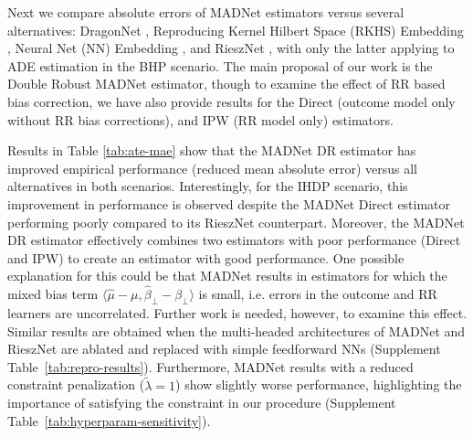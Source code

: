 Next we compare absolute errors of MADNet estimators versus several alternatives: DragonNet \citep{Shi2019}, Reproducing Kernel Hilbert Space (RKHS) Embedding \citep{Singh2023}, Neural Net (NN) Embedding \citep{Xu2022}, and RieszNet \citep{Chernozhukov2022}, with only the latter applying to ADE estimation in the BHP scenario. The main proposal of our work is the Double Robust MADNet estimator, though to examine the effect of RR based bias correction, we have also provide results for the Direct (outcome model only without RR bias corrections), and IPW (RR model only) estimators.

Results in Table \ref{tab:ate-mae} show that the MADNet DR estimator has improved empirical performance (reduced mean absolute error) versus all alternatives in both scenarios. Interestingly, for the IHDP scenario, this improvement in performance is observed despite the MADNet Direct estimator performing poorly compared to its RieszNet counterpart. Moreover, the MADNet DR estimator effectively combines two estimators with poor performance (Direct and IPW) to create an estimator with good performance. One possible explanation for this could be that MADNet results in estimators for which the mixed bias term $\langle \hat{\mu} - \mu, \hat{\beta}_\perp - \beta_\perp \rangle$ is small, i.e. errors in the outcome and RR learners are uncorrelated. Further work is needed, however, to examine this effect.
Similar results are obtained when the multi-headed architectures of MADNet and RieszNet are ablated and replaced with simple feedforward NNs (Supplement Table~\ref{tab:repro-results}). Furthermore, MADNet results with a reduced constraint penalization ($\tilde{\lambda} = 1$) show slightly worse performance, highlighting the importance of satisfying the constraint in our procedure (Supplement Table~\ref{tab:hyperparam-sensitivity}).


